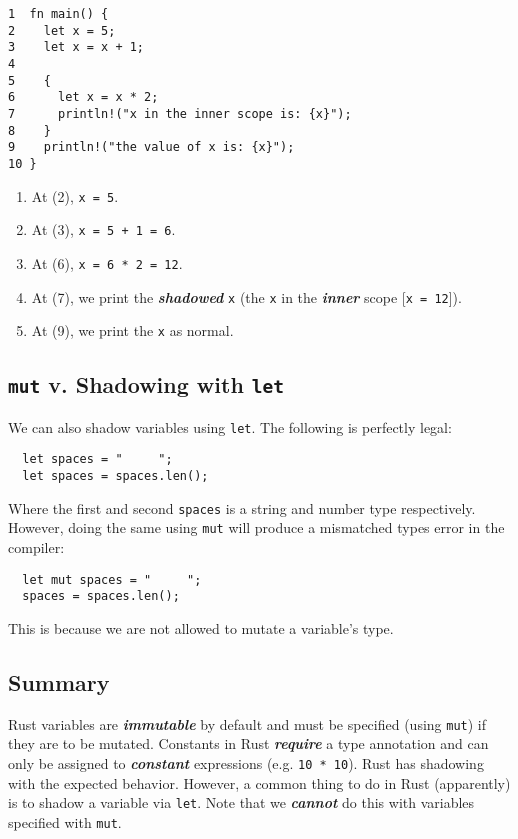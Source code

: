 \documentclass{report}
\newcommand{\textib}[1]{\textit{\textbf{{#1}}}}
\newcommand{\code}[1]{\texttt{{#1}}}
\begin{document}
\begin{lstlisting}
1  fn main() {
2    let x = 5;
3    let x = x + 1;
4
5    {
6      let x = x * 2;
7      println!("x in the inner scope is: {x}");
8    }
9    println!("the value of x is: {x}");
10 }
\end{lstlisting}
\begin{enumerate}[label=,leftmargin=0pt]
    \item At (2), \code{x = 5}.
    \item At (3), \code{x = 5 + 1 = 6}.
    \item At (6), \code{x = 6 * 2 = 12}.
    \item At (7), we print the \textib{shadowed} \code{x} (the \code{x} in the \textib{inner} scope
        [\code{x = 12}]).
    \item At (9), we print the \code{x} as normal.
\end{enumerate}


\subsection{\texttt{mut} v. Shadowing with \texttt{let}} 
We can also shadow variables using \code{let}. The following is perfectly legal:
\begin{lstlisting}
  let spaces = "     ";
  let spaces = spaces.len();
\end{lstlisting}
Where the first and second \code{spaces} is a string and number type respectively.
\newline
\newline
However, doing the same using \code{mut} will produce a mismatched types error in the compiler:
\begin{lstlisting}
  let mut spaces = "     ";
  spaces = spaces.len();
\end{lstlisting}
This is because we are not allowed to mutate a variable's type.


\subsection{Summary}
Rust variables are \textib{immutable} by default and must be specified (using \code{mut}) if they
are to be mutated. 
\newline
\newline
Constants in Rust \textib{require} a type annotation and can only be assigned to
\textib{constant} expressions (e.g. \code{10 * 10}). 
\newline
\newline
Rust has shadowing with the expected behavior. However, a common thing to do in Rust (apparently)
is to shadow a variable via \code{let}. Note that we \textib{cannot} do this with variables 
specified with \code{mut}.
\end{document}
